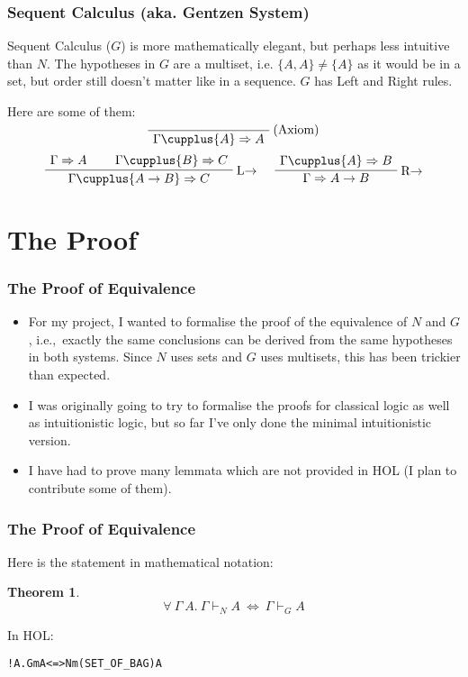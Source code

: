 \documentclass[english,svgnames,hide notes,12pt]{beamer}
\newtheorem{thm}{Theorem}
\theoremstyle{definition}
\theoremstyle{remark}
\begin{document}
\begin{frame}
    \frametitle{Sequent Calculus (aka. Gentzen System)}
    Sequent Calculus ($G$) is more mathematically elegant, but perhaps less intuitive than $N$. The hypotheses in $G$ are a multiset, i.e. $\{A,A\}\neq\{A\}$ as it would be in a set, but order still doesn't matter like in a sequence. $G$ has Left and Right rules.

    Here are some of them:
    \[
        \AxiomC{}
        \RightLabel{(Axiom)}
        \UnaryInfC{$\Gamma \cupplus \{A\}\Rightarrow A$}
        \DisplayProof
    \]
    \[
        \AxiomC{$\Gamma\Rightarrow A$}
        \AxiomC{$\Gamma\cupplus\{B\}\Rightarrow C$}
        \RightLabel{L$\to$}
        \BinaryInfC{$\Gamma\cupplus\{A\to B\}\Rightarrow C$}
        \DisplayProof
        \hspace{0.5cm}
        \AxiomC{$\Gamma\cupplus\{A\}\Rightarrow B$}
        \RightLabel{R$\to$}
        \UnaryInfC{$\Gamma\Rightarrow A\to B$}
        \DisplayProof
    \]
\end{frame}

\section{The Proof}

\begin{frame}
    \frametitle{The Proof of Equivalence}
    \begin{itemize}
        \item For my project, I wanted to formalise the proof of the equivalence of $N$ and $G$, i.e.,\ exactly the same conclusions can be derived from the same hypotheses in both systems. Since $N$ uses sets and $G$ uses multisets, this has been trickier than expected. 
        \item I was originally going to try to formalise the proofs for classical logic as well as intuitionistic logic, but so far I've only done the minimal intuitionistic version.
        \item I have had to prove many lemmata which are not provided in HOL (I plan to contribute some of them).
    \end{itemize}
\end{frame}

\begin{frame}[fragile]
    \frametitle{The Proof of Equivalence}
    Here is the statement in mathematical notation:
    \begin{thm}
        \[\forall ~\Gamma ~A. ~\Gamma \vdash_N A ~\Leftrightarrow~ \Gamma \vdash_G A\]
    \end{thm}
    In HOL:

    \begin{alltt}
        !\textGamma A. Gm \textGamma A <=> Nm (SET_OF_BAG \textGamma) A
    \end{alltt}
\end{frame}
\end{document}
